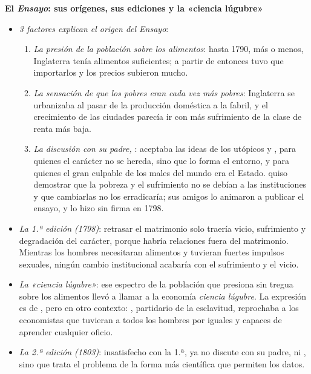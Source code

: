 \documentclass[11pt]{article}
\begin{document}
\begin{anotaciones}
\textbf{El \emph{Ensayo}: sus orígenes, sus ediciones y la «ciencia lúgubre»}\nocite{LandrethColander2006Historia}
\begin{itemize}
\item \emph{3 factores explican el origen del \emph{Ensayo}}:
  \begin{enumerate}
  \item \emph{La presión de la población sobre los alimentos}: hasta 1790, más o menos, Inglaterra tenía alimentos suficientes; a partir de entonces tuvo que importarlos y los precios subieron mucho.
  \item \emph{La sensación de que los pobres eran cada vez más pobres}: Inglaterra se urbanizaba al pasar de la producción doméstica a la fabril, y el crecimiento de las ciudades parecía ir con más sufrimiento de la clase de renta más baja.
  \item \emph{La discusión con su padre, }: aceptaba las ideas de los utópicos  y , para quienes el carácter no se hereda, sino que lo forma el entorno, y para quienes el gran culpable de los males del mundo era el Estado.  quiso demostrar que la pobreza y el sufrimiento no se debían a las instituciones y que cambiarlas no los erradicaría; sus amigos lo animaron a publicar el ensayo, y lo hizo sin firma en 1798.
  \end{enumerate}
\item \emph{La 1.ª edición (1798)}: retrasar el matrimonio solo traería vicio, sufrimiento y degradación del carácter, porque habría relaciones fuera del matrimonio. Mientras los hombres necesitaran alimentos y tuvieran fuertes impulsos sexuales, ningún cambio institucional acabaría con el sufrimiento y el vicio.
\item \emph{La «ciencia lúgubre»}: ese espectro de la población que presiona sin tregua sobre los alimentos llevó a llamar a la economía \emph{ciencia lúgubre}. La expresión es de \textcite{Carlyle1849Occasional}, pero en otro contexto: , partidario de la esclavitud, reprochaba a los economistas que tuvieran a todos los hombres por iguales y capaces de aprender cualquier oficio.
\item \emph{La 2.ª edición (1803)}: insatisfecho con la 1.ª,  ya no discute con su padre,  ni , sino que trata el problema de la forma más científica que permiten los datos.
  \begin{itemize}

\end{itemize}
\end{itemize}
\end{anotaciones}
\end{document}
